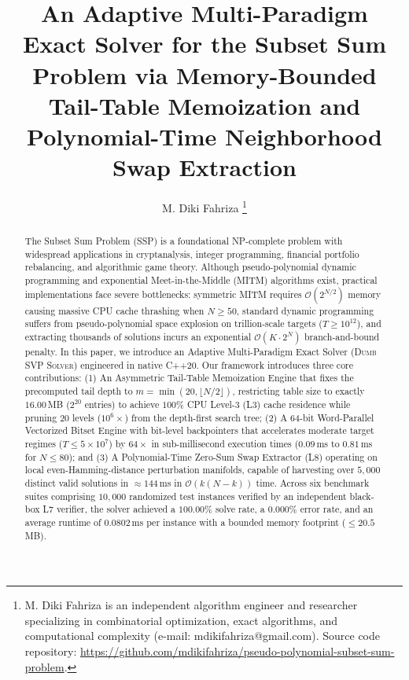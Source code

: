 \documentclass[journal,onecolumn,11pt]{IEEEtran}
\begin{document}
\title{An Adaptive Multi-Paradigm Exact Solver for the Subset Sum Problem via Memory-Bounded Tail-Table Memoization and Polynomial-Time Neighborhood Swap Extraction}

\author{M. Diki Fahriza
\thanks{M. Diki Fahriza is an independent algorithm engineer and researcher specializing in combinatorial optimization, exact algorithms, and computational complexity (e-mail: mdikifahriza@gmail.com). Source code repository: \url{https://github.com/mdikifahriza/pseudo-polynomial-subset-sum-problem}.}}

\maketitle

\begin{abstract}
The Subset Sum Problem (SSP) is a foundational NP-complete problem with widespread applications in cryptanalysis, integer programming, financial portfolio rebalancing, and algorithmic game theory. Although pseudo-polynomial dynamic programming and exponential Meet-in-the-Middle (MITM) algorithms exist, practical implementations face severe bottlenecks: symmetric MITM requires $\mathcal{O}(2^{N/2})$ memory causing massive CPU cache thrashing when $N \ge 50$, standard dynamic programming suffers from pseudo-polynomial space explosion on trillion-scale targets ($T \ge 10^{12}$), and extracting thousands of solutions incurs an exponential $\mathcal{O}(K \cdot 2^N)$ branch-and-bound penalty. In this paper, we introduce an Adaptive Multi-Paradigm Exact Solver (\textsc{Dumb SVP Solver}) engineered in native C++20. Our framework introduces three core contributions: (1) An Asymmetric Tail-Table Memoization Engine that fixes the precomputed tail depth to $m = \min(20, \lfloor N/2 \rfloor)$, restricting table size to exactly $16.00$\,MB ($2^{20}$ entries) to achieve $100\%$ CPU Level-3 (L3) cache residence while pruning $20$ levels ($10^6\times$) from the depth-first search tree; (2) A 64-bit Word-Parallel Vectorized Bitset Engine with bit-level backpointers that accelerates moderate target regimes ($T \le 5 \times 10^7$) by $64\times$ in sub-millisecond execution times ($0.09$\,ms to $0.81$\,ms for $N \le 80$); and (3) A Polynomial-Time Zero-Sum Swap Extractor (L8) operating on local even-Hamming-distance perturbation manifolds, capable of harvesting over $5{,}000$ distinct valid solutions in $\approx 144$\,ms in $\mathcal{O}(k(N-k))$ time. Across six benchmark suites comprising $10{,}000$ randomized test instances verified by an independent black-box L7 verifier, the solver achieved a $100.00\%$ solve rate, a $0.000\%$ error rate, and an average runtime of $0.0802$\,ms per instance with a bounded memory footprint ($\le 20.5$\,MB).
\end{abstract}
\end{document}
